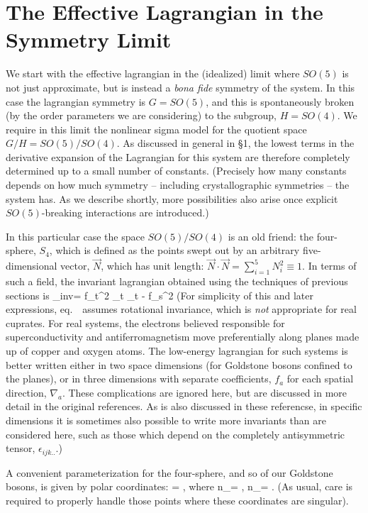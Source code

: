 \documentclass[12pt]{report}
\def\nq{n_\ssq}
\def\ns{n_\ssS}
\def\inv{{\rm inv}}
\begin{document}
\section{The Effective Lagrangian in the Symmetry Limit}

We start with the effective lagrangian in the (idealized)
limit where $SO(5)$ is not just approximate, but is instead
a {\it bona fide} symmetry of the system. In this case the
lagrangian symmetry is $G = SO(5)$, and this is
spontaneously broken (by the order parameters we are
considering) to the subgroup, $H = SO(4)$. We require in
this limit the nonlinear sigma model for the quotient space
$G/H = SO(5)/SO(4)$. As discussed in general in \S1, the
lowest terms in the derivative expansion of the Lagrangian
for this system are therefore completely determined up to a
small number of constants. (Precisely how many constants
depends on how much symmetry -- including crystallographic
symmetries -- the system has. As we describe shortly, more
possibilities also arise once explicit $SO(5)$-breaking
interactions are introduced.)

In this particular case the space $SO(5)/SO(4)$ is an old
friend: the four-sphere, $S_4$, which is defined as the
points swept out by an arbitrary five-dimensional vector,
$\vec{N}$, which has unit length: $\vec{N} \cdot \vec{N} =
\sum_{i=1}^5 N_i^2 \equiv 1$. In terms of such a field, the
invariant lagrangian obtained using the techniques of
previous sections is
%
\eq
\label{simpinvlagr}
\Scl_\inv = {f_t^2 } \;
\partial_t  \cdot  \partial_t
  - {f_s^2 } \; \nabla
{} \cdot  \nabla  {}
\eeq
%
(For simplicity of this and later expressions, 
eq.~\ assumes rotational invariance,
which is 
{\it not} appropriate for real cuprates. For real systems,
the electrons believed responsible for superconductivity
and antiferromagnetism move preferentially along planes
made up of copper and oxygen atoms. The low-energy
lagrangian for such systems is better written either in two
space dimensions (for Goldstone bosons confined to the
planes), or in three dimensions with separate coefficients,
$f_a$ for each spatial direction, 
$\nabla_a$. These complications are ignored here, but are
discussed in more detail in the original references. As is
also discussed in these referencse, in specific dimensions
it is sometimes also possible to write more invariants than
are considered here, such as those which depend on the
completely antisymmetric tensor, $\epsilon_{ijk..}$.)

A convenient parameterization for the four-sphere, and so
of our Goldstone bosons, is given by polar coordinates:
%
\eq
\label{explangles}
 = \pmatrix{\nq \cr \ns \cr}, 
\qquad \hbox{where}
\qquad
\nq = \cos\theta  \pmatrix{\cos\phi 
\cr \sin\phi \cr}, \qquad
\ns = \sin\theta \pmatrix{ \sin\alpha 
\cos\beta \cr  \sin\alpha \sin\beta \cr
\cos\alpha\cr} .
\eeq
%
(As usual, care is required to properly handle those points
where these coordinates are singular).
\end{document}
